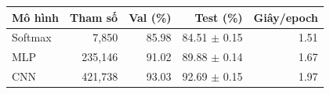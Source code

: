 \begin{tabularx}{\textwidth}{@{}Xrrrr@{}}
\toprule
Mô hình & Tham số & Val (\%) & Test (\%) & Giây/epoch \\
\midrule
Softmax & 7,850 & 85.98 & 84.51 $\pm$ 0.15 & 1.51 \\
MLP & 235,146 & 91.02 & 89.88 $\pm$ 0.14 & 1.67 \\
CNN & 421,738 & 93.03 & 92.69 $\pm$ 0.15 & 1.97 \\
\bottomrule
\end{tabularx}
